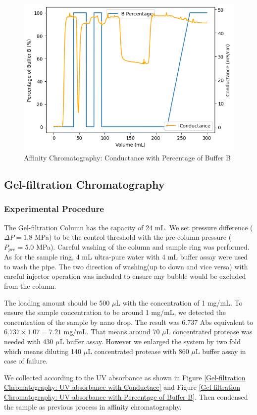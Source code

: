 \documentclass{report}
\begin{document}
\begin{figure}
    \centering
    \includegraphics[width=0.6\linewidth]{../Figures/Affinity Column Conductance.png}
    \caption{Affinity Chromatography: Conductance with Percentage of Buffer B}
    \label{Affinity Chromatography: Conductance}
\end{figure}


\subsection{Gel-filtration Chromatography}
\subsubsection{Experimental Procedure}
The Gel-filtration Column has the capacity of 24 mL.
We set pressure difference ($\Delta P=1.8$ MPa) to be the control threshold with the pre-column pressure ($P_{pre}=5.0$ MPa).
Careful washing of the column and sample ring was performed.
As for the sample ring, 4 mL ultra-pure water with 4 mL buffer assay were used to wash the pipe.
The two direction of washing(up to down and vice versa) with careful injector operation was included to ensure any bubble would be excluded from the column.

The loading amount should be 500 $\mu$L with the concentration of 1 mg/mL.
To ensure the sample concentration to be around 1 mg/mL, we detected the concentration of the sample by nano drop.
The result was 6.737 Abs equivalent to $6.737\times1.07=7.21$ mg/mL.
That means around 70 $\mu$L concentrated protease was needed with 430 $\mu$L buffer assay.
However we enlarged the system by two fold which means diluting 140 $\mu$L concentrated protease with 860 $\mu$L buffer assay in case of failure.



We collected according to the UV absorbance as shown in Figure \ref{Gel-filtration Chromatography: UV absorbance with Conductace} and Figure \ref{Gel-filtration Chromatography: UV absorbance with Percentage of Buffer B}.
Then condensed the sample as previous process in affinity chromatography.
\end{document}
